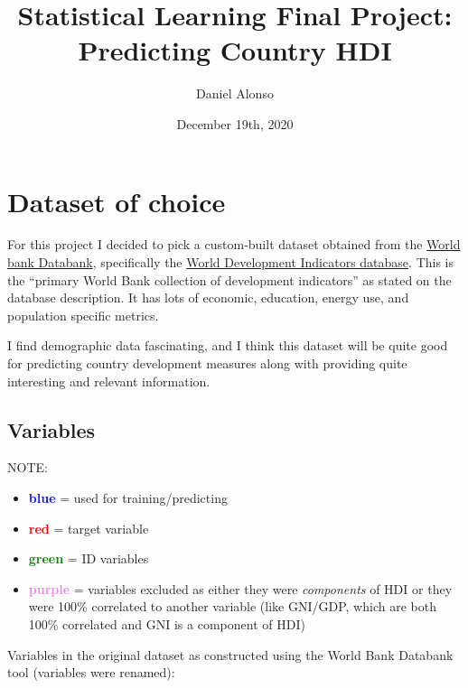 \documentclass[]{article}
\title{Statistical Learning Final Project: Predicting Country HDI}
\author{Daniel Alonso}
\date{December 19th, 2020}
\providecommand{\tightlist}{%
  \setlength{\itemsep}{0pt}\setlength{\parskip}{0pt}}
\begin{document}
\maketitle

{
\setcounter{tocdepth}{4}
\tableofcontents
}
\newpage

\hypertarget{dataset-of-choice}{%
\section{Dataset of choice}\label{dataset-of-choice}}

For this project I decided to pick a custom-built dataset obtained from
the \href{https://databank.worldbank.org/home.aspx}{World bank
Databank}, specifically the
\href{https://databank.worldbank.org/source/world-development-indicators}{World
Development Indicators database}. This is the ``primary World Bank
collection of development indicators'' as stated on the database
description. It has lots of economic, education, energy use, and
population specific metrics.

I find demographic data fascinating, and I think this dataset will be
quite good for predicting country development measures along with
providing quite interesting and relevant information.

\hypertarget{variables}{%
\subsection{Variables}\label{variables}}

\large

NOTE: \normalsize

\begin{itemize}
\tightlist
\item
  \textbf{\textcolor{blue}{blue}} = used for training/predicting
\item
  \textbf{\textcolor{red}{red}} = target variable
\item
  \textbf{\textcolor{green}{green}} = ID variables
\item
  \textbf{\textcolor{violet}{purple}} = variables excluded as either
  they were \emph{components} of HDI or they were 100\% correlated to
  another variable (like GNI/GDP, which are both 100\% correlated and
  GNI is a component of HDI)
\end{itemize}

Variables in the original dataset as constructed using the World Bank
Databank tool (variables were renamed):
\end{document}
